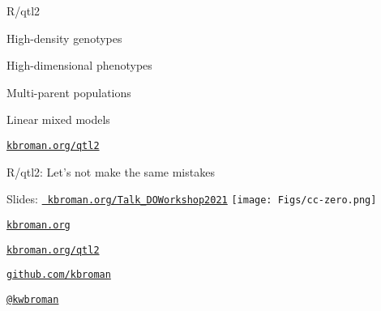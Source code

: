 \documentclass[12pt,t,aspectratio=169]{beamer}
\begin{document}
\begin{frame}[c]{R/qtl2}

\vspace*{-16.2mm}

  \vspace{21mm}

  \bbi
\item High-density genotypes
\item High-dimensional phenotypes
\item Multi-parent populations
\item Linear mixed models
  \ei

  \vspace{25mm}

\hfill \href{https://kbroman.org/qtl2}{\small \tt kbroman.org/qtl2}

\end{frame}



\begin{frame}[c]{R/qtl2: \color{foreground} Let's not make the same mistakes}

  \bbi
{}
\ei

\end{frame}




\begin{frame}[c]{}

\Large

\scriptsize {\lolit Slides:} \href{https://kbroman.org/Talk_DOWorkshop2021}{\tt \scriptsize
  \color{foreground} kbroman.org/Talk\_DOWorkshop2021} \quad
\texttt{[image: Figs/cc-zero.png]}

\vspace{7mm}

\href{https://kbroman.org}{\tt \lolit kbroman.org}

\vspace{7mm}

\href{https://kbroman.org/qtl2}{\tt kbroman.org/qtl2}

\vspace{7mm}

\href{https://github.com/kbroman}{\tt \lolit github.com/kbroman}

\vspace{7mm}

\href{https://twitter.com/kwbroman}{\tt \lolit @kwbroman}


\end{frame}
\end{document}

